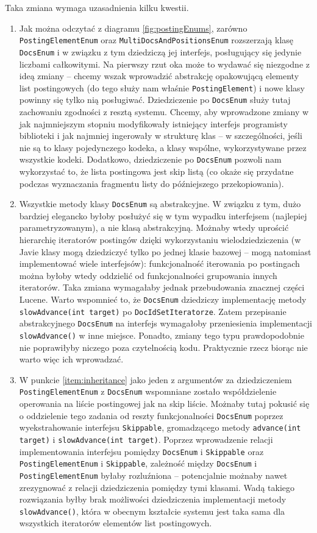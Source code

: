 Taka zmiana wymaga uzasadnienia kilku kwestii.
\begin{enumerate}
 \item \label{item:inheritance} Jak można odczytać z diagramu \ref{fig:postingEnums}, zarówno \texttt{PostingElementEnum} oraz \texttt{MultiDocsAndPositionsEnum} rozszerzają klasę \texttt{DocsEnum} i w związku z tym dziedziczą jej interfejs, posługujący się jedynie liczbami całkowitymi. Na pierwszy rzut oka może to wydawać się niezgodne z ideą zmiany -- chcemy wszak wprowadzić abstrakcję opakowującą elementy list postingowych (do tego służy nam właśnie \texttt{PostingElement}) i nowe klasy powinny się tylko nią posługiwać. Dziedziczenie po \texttt{DocsEnum} służy tutaj zachowaniu zgodności z resztą systemu. Chcemy, aby wprowadzone zmiany w jak najmniejszym stopniu modyfikowały istniejący interfejs programisty biblioteki i jak najmniej ingerowały w strukturę klas -- w szczególności, jeśli nie są to klasy pojedynczego kodeka, a klasy wspólne, wykorzystywane przez wszystkie kodeki. Dodatkowo, dziedziczenie po \texttt{DocsEnum} pozwoli nam wykorzystać to, że lista postingowa jest skip listą (co okaże się przydatne podczas wyznaczania fragmentu listy do późniejszego przekopiowania).
 \item Wszystkie metody klasy \texttt{DocsEnum} są abstrakcyjne. W związku z tym, dużo bardziej elegancko byłoby posłużyć się w tym wypadku interfejsem (najlepiej parametryzowanym), a nie klasą abstrakcyjną. Możnaby wtedy uprościć hierarchię iteratorów postingów dzięki wykorzystaniu wielodziedziczenia (w Javie klasy mogą dziedziczyć tylko po jednej klasie bazowej -- mogą natomiast implementować wiele interfejsów): funkcjonalność iterowania po postingach można byłoby wtedy oddzielić od funkcjonalności grupowania innych iteratorów. Taka zmiana wymagałaby jednak przebudowania znacznej części Lucene. Warto wspomnieć to, że \texttt{DocsEnum} dziedziczy implementację metody \texttt{slowAdvance(int target)} po \texttt{DocIdSetIteratorze}. Zatem przepisanie abstrakcyjnego \texttt{DocsEnum} na interfejs wymagałoby przeniesienia implementacji \texttt{slowAdvance()} w inne miejsce. Ponadto, zmiany tego typu prawdopodobnie nie poprawiłyby niczego poza czytelnością kodu. Praktycznie rzecz biorąc nie warto więc ich wprowadzać.
 \item W punkcie \ref{item:inheritance} jako jeden z argumentów za dziedziczeniem \texttt{PostingElementEnum} z \texttt{DocsEnum} wspomniane zostało współdzielenie operowania na liście postingowej jak na skip liście. Możnaby tutaj pokusić się o oddzielenie tego zadania od reszty funkcjonalności \texttt{DocsEnum} poprzez wyekstrahowanie interfejsu \texttt{Skippable}, gromadzącego metody \texttt{advance(int target)} i \texttt{slowAdvance(int target)}. Poprzez wprowadzenie relacji implementowania interfejsu pomiędzy \texttt{DocsEnum} i \texttt{Skippable} oraz \texttt{PostingElementEnum} i \texttt{Skippable}, zależność między \texttt{DocsEnum} i \texttt{PostingElementEnum} byłaby rozluźniona -- potencjalnie możnaby nawet zrezygnować z relacji dziedziczenia pomiędzy tymi klasami. Wadą takiego rozwiązania byłby brak możliwości dziedziczenia implementacji metody \texttt{slowAdvance()}, która w obecnym kształcie systemu jest taka sama dla wszystkich iteratorów elementów list postingowych.

\end{enumerate}
